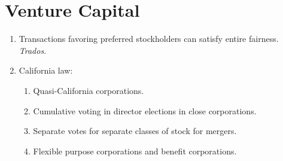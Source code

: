 \newpage

\section{Venture Capital}

\begin{enumerate}
    \item Transactions favoring preferred stockholders can satisfy entire 
    fairness. \emph{Trados}.
    \item California law:
    \begin{enumerate}
        \item Quasi-California corporations.
        \item Cumulative voting in director elections in close corporations.
        \item Separate votes for separate classes of stock for mergers.
        \item Flexible purpose corporations and benefit corporations.
    \end{enumerate}
\end{enumerate}
